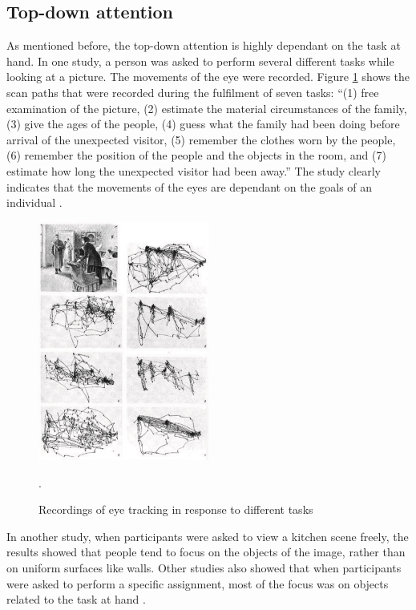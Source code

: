 \subsection{Top-down attention}\label{subsec:topdown_attention}
As mentioned before, the top-down attention is highly dependant on the task at hand. In one study, a person was asked to perform several different tasks while looking at a picture. The movements of the eye were recorded. Figure \ref{fig:eye_movement_recording} shows the scan paths that were recorded during the fulfilment of seven tasks: “(1) free examination of the picture, (2) estimate the material circumstances of the family, (3) give the ages of the people, (4) guess what the family had been doing before arrival of the unexpected visitor, (5) remember the clothes worn by the people, (6) remember the position of the people and the objects in the room, and (7) estimate how long the unexpected visitor had been away.” The study clearly indicates that the movements of the eyes are dependant on the goals of an individual \cite{sundstedt2012gazing}. 

\begin{figure}[h!]
	\centering
	\includegraphics[width=0.5\textwidth]{figures/eye_movement_recording.jpg}
	\caption{Recordings of eye tracking in response to different tasks \cite{sundstedt2012gazing}}.\label{fig:eye_movement_recording}
\end{figure}

In another study, when participants were asked to view a kitchen scene freely, the results showed that people tend to focus on the objects of the image, rather than on uniform surfaces like walls. Other studies also showed that when participants were asked to perform a specific assignment, most of the focus was on objects related to the task at hand \cite{sundstedt2012gazing}. 


